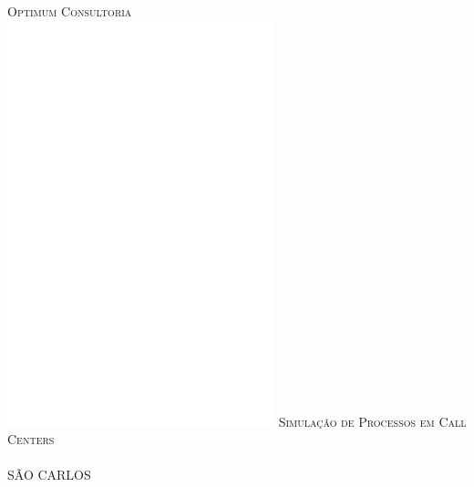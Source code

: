 
\pagecolor{OptimumGray}\afterpage{\nopagecolor}

\begin{titlepage}
\selectfont
\pagecolor{OptimumGray}\afterpage{\nopagecolor}
\center
\color{white}
\vspace*{5px} 
\textsc{\Huge Optimum Consultoria}\\[0.4cm] 
\vfill
\includegraphics[scale = 2.05]{capa/images/Logo_short_transparente_branco.png}
\vfill
\textsc{\LARGE Simulação de Processos em Call Centers} \\[0.5cm]
\textsc{\huge } \\ [0.5cm] 
\vspace*{\fill}
\large{SÃO CARLOS}
\end{titlepage}
\restoregeometry
\newpage%
\newcommand\blankpage{%
    \null
    \thispagestyle{empty}%
    \addtocounter{page}{-1}%
    \newpage}

\afterpage{\blankpage}

\color{black}
